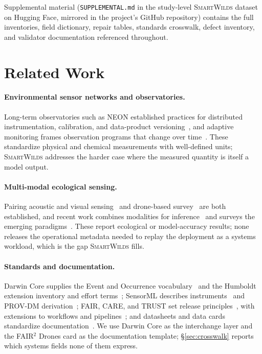 \documentclass[sigconf]{acmart}
\newcommand{\smartwilds}{\textsc{SmartWilds}\xspace}
\begin{document}
Supplemental material (\texttt{SUPPLEMENTAL.md} in the study-level
\smartwilds dataset on Hugging Face, mirrored in the project's GitHub
repository) contains the full inventories, field dictionary, repair
tables, standards crosswalk, defect inventory, and validator
documentation referenced throughout.


\section{Related Work}
\label{sec:related}

\paragraph{Environmental sensor networks and observatories.}
Long-term observatories such as NEON established practices for
distributed instrumentation, calibration, and data-product
versioning~\cite{metzger2019neon,staccone2021neon}, and adaptive
monitoring frames observation programs that change over
time~\cite{lindenmayer2009adaptive,henrys2024adaptive,jain2004adaptive}.
These standardize physical and chemical measurements with well-defined
units; \smartwilds addresses the harder case where the measured quantity
is itself a model output.

\paragraph{Multi-modal ecological sensing.}
Pairing acoustic and visual
sensing~\cite{buxton2018pairing,Waegele2022Multisensor} and drone-based
survey~\cite{koger2023drones,Koger2026Efficient,Schad2023Drones,Corcoran2021Automated}
are both established, and recent work combines modalities for
inference~\cite{Haucke2025DeepMultimodal,Miao2026Multimodal,Chen2026Snapshots}
and surveys the emerging
paradigms~\cite{lombardo2026paradigms,tuia2022perspectives,Tuia2026Digital,Pollock2025Harnessing,pollock2026roam,pierrat2025proximal}.
These report ecological or model-accuracy results; none releases the
operational metadata needed to replay the deployment as a systems
workload, which is the gap \smartwilds fills.

\paragraph{Standards and documentation.}
Darwin Core supplies the Event and Occurrence
vocabulary~\cite{wieczorek2012darwincore,tdwgDarwinCore} and the
Humboldt extension inventory and effort terms~\cite{tdwgHumboldt};
SensorML describes instruments~\cite{ogcSensorML} and PROV-DM
derivation~\cite{w3cProvDM}; FAIR, CARE, and TRUST set release
principles~\cite{wilkinson2016fair,carroll2020care,lin2020trust}, with
extensions to workflows and
pipelines~\cite{wilkinson2025fairworkflows,mitchell2022fairpipeline,pennington2025pipeline,woodcharlson2026faircope};
and datasheets and data cards standardize
documentation~\cite{gebru2021datasheets,pushkarna2022datacards}. We use
Darwin Core as the interchange layer and the FAIR$^2$ Drones card as the
documentation template; \S\ref{sec:crosswalk} reports which systems
fields none of them express.
\end{document}
